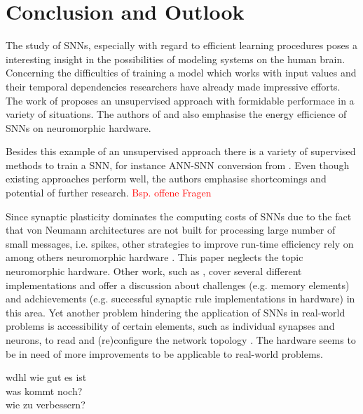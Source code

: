 \section{Conclusion and Outlook}
\label{sec:conclusion}

The study of \acp{SNN}, especially with regard to efficient learning procedures poses a interesting insight in the possibilities of modeling
systems on the human brain.
Concerning the difficulties of training a model which works with input values and their temporal dependencies researchers have already made 
impressive efforts.
The work of \cite{SNN} proposes an unsupervised approach with formidable performace in a variety of situations.
The authors of \cite{SNN} and \cite{Synaptic_plasticity} also emphasise the energy efficience of \acp{SNN} on neuromorphic hardware.

Besides this example of an unsupervised approach there is a variety of supervised methods to train a \ac{SNN}, 
for instance \ac{ANN}-\ac{SNN} conversion from \cite{DIET_SNN}.
Even though existing approaches perform well, the authors emphasise shortcomings and potential of further research.
\textcolor{red}{Bsp. offene Fragen}

Since synaptic plasticity dominates the computing costs of \acp{SNN} due to the fact that von Neumann architectures are not built for processing large number of small messages, i.e. spikes, 
other strategies to improve run-time efficiency rely on among others neuromorphic hardware \cite{simulation_STDP}.
This paper neglects the topic neuromorphic hardware.
Other work, such as \cite{Synaptic_plasticity}, 
cover several different implementations and offer a discussion about challenges (e.g. memory elements) and adchievements 
(e.g. successful synaptic rule implementations in hardware) in this area.
Yet another problem hindering the application of \acp{SNN} in real-world problems is accessibility of certain elements, such as individual synapses and neurons, 
to read and (re)configure the network topology \cite{hardware_STDP}.
The hardware seems to be in need of more improvements to be applicable to real-world problems.

wdhl wie gut es ist\\
was kommt noch?\\
wie zu verbessern?